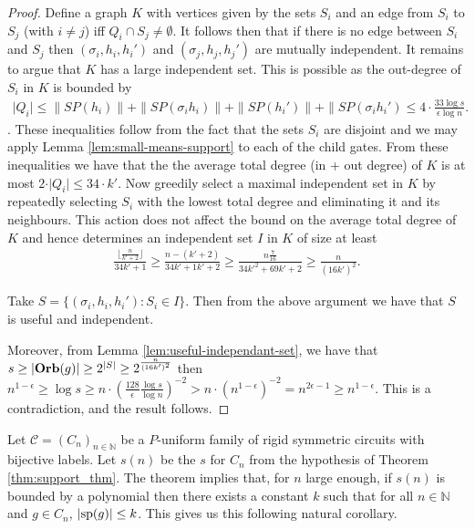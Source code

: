 \documentclass[../paper.tex]{subfiles}
\begin{document}
\begin{proof}
  Define a graph $K$ with vertices given by the sets $S_i$ and an edge from
  $S_i$ to $S_j$ (with $i \neq j$) iff $Q_i \cap S_j \neq \emptyset$. It follows
  then that if there is no edge between $S_i$ and $S_j$ then $(\sigma_i, h_i,
  h_i')$ and $(\sigma_j, h_j, h_j')$ are mutually independent. It remains to
  argue that $K$ has a large independent set. This is possible as the out-degree
  of $S_i$ in $K$ is bounded by
  \begin{align*}
    \vert Q_i \vert \leq \|SP(h_i) \| + \|SP(\sigma_i h_i) \| + \|SP(h_i') \| + \|SP(\sigma_i h_i') \leq 4 \cdot \frac{33\log s}{\epsilon \log n}.
  \end{align*}. 
  These inequalities follow from the fact that the sets $S_i$ are disjoint and we may apply Lemma
  \ref{lem:small-means-support} to each of the child gates. From these inequalities
  we have that the the average total degree (in + out degree) of $K$ is at most $2 \cdot \vert Q_i
  \vert \leq 34 \cdot k'$. Now greedily select a maximal independent set in $K$
  by repeatedly selecting $S_i$ with the lowest total degree and eliminating it
  and its neighbours. This action does not affect the bound on the average total
  degree of $K$ and hence determines an independent set $I$ in $K$ of size at
  least
  \begin{align*}
    \frac{\lfloor \frac{n}{k' + 2} \rfloor}{34k' + 1} \geq \frac{n - (k'+2)}{34k'+1k'+2} \geq \frac{n\frac{7}{16}}{34k'^2 + 69k' +2} \geq \frac{n}{(16k')^2}.
  \end{align*}

  Take $S = \{(\sigma_i, h_i, h_i') : S_i \in I \}$. Then from the above
  argument we have that $S$ is useful and independent.
  
  Moreover, from Lemma \ref{lem:useful-independant-set}, we have that $s \geq
  \vert \text{\textbf{Orb}}(g) \vert \geq 2^{\vert S \vert} \geq 2^{\frac{n}{(16k')^2}}$ then
  $n^{1-\epsilon} \geq \log s \geq n \cdot (\frac{128}{\epsilon}\frac{\log
    s}{\log n})^{-2} > n \cdot (n^{1-\epsilon})^{-2} = n^{2\epsilon -1} \geq
  n^{1-\epsilon}$. This is a contradiction, and the result follows.
\end{proof}
 
Let $\mathcal{C} = (C_n)_{n \in \mathbb{N}}$ be a $P$-uniform family of rigid
symmetric circuits with bijective labels. Let $s(n)$ be the $s$ for $C_n$ from
the hypothesis of Theorem \ref{thm:support_thm}. The theorem implies that, for
$n$ large enough, if $s(n)$ is bounded by a polynomial then there exists a
constant $k$ such that for all $n \in \mathbb{N}$ and $g \in C_n$, $\vert
\text{sp}(g) \vert \leq k$. This gives us this following natural corollary.
\end{document}
